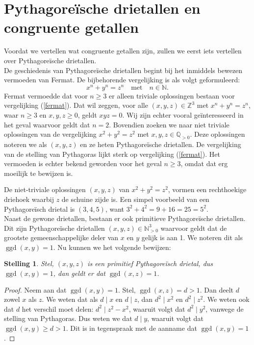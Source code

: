 \documentclass[12pt,reqno]{article}
\newcommand*{\NN}{\ensuremath{\mathbb{N}}}
\newcommand*{\ZZ}{\ensuremath{\mathbb{Z}}}
\newcommand*{\QQ}{\ensuremath{\mathbb{Q}}}
\theoremstyle{theorem}
\newtheorem{theorem}{Stelling}
\theoremstyle{definition}
\DeclareMathOperator{\ggd}{ggd}
\begin{document}
	
	\section{Pythagore\"ische drietallen en congruente getallen}\label{sec:def}
	Voordat we vertellen wat congruente getallen zijn, zullen we eerst iets vertellen over Pythagore\"ische drietallen.\\
	
	De geschiedenis van Pythagore\"ische drietallen begint bij het inmiddels bewezen vermoeden van Fermat. De bijbehorende vergelijking is als volgt geformuleerd:
	\begin{equation}\label{fermat}
	x^n + y^n = z^n \quad \text{met} \quad n \in \NN.
	\end{equation}
	Fermat vermoedde dat voor $n \geq 3$ er alleen triviale oplossingen bestaan voor vergelijking (\ref{fermat}). Dat wil zeggen, voor alle $(x,y,z) \in \ZZ^3$ met $x^n + y^n = z^n$, waar $n \geq 3$ en $x, y, z \geq 0$, geldt $xyz = 0$. Wij zijn echter vooral ge\"interesseerd in het geval waarvoor geldt dat $n=2$. Bovendien zoeken we naar niet triviale oplossingen van de vergelijking $x^2 + y^2 = z^2$ met $x,y,z \in\QQ_{>0}$. Deze oplossingen noteren we als $(x,y,z)$ en ze heten Pythagore\"ische drietallen. De vergelijking van de stelling van Pythagoras lijkt sterk op vergelijking (\ref{fermat}). Het vermoeden is echter bekend geworden voor het geval $n \geq 3$, omdat dat erg moeilijk te bewijzen is.
	
	De niet-triviale oplossingen $(x,y,z)$ van $x^2 + y^2 = z^2$, vormen een rechthoekige driehoek waarbij $z$ de schuine zijde is. Een simpel voorbeeld van een Pythagore\"isch drietal is $(3,4,5)$, want $3^2 + 4^2 = 9 + 16 = 25 = 5^2$. \\
	
	Naast de gewone drietallen, bestaan er ook primitieve \mbox{Pythagore\"ische} drietallen. Dit zijn Pythagore\"ische drietallen $(x,y,z)\in\NN^3_{>0}$ waarvoor geldt dat de grootste gemeenschappelijke deler van $x$ en $y$ gelijk is aan 1. We noteren dit als $\ggd(x,y) = 1$. Nu kunnen we het volgende bewijzen:
	
	\begin{theorem}
		Stel, $(x,y,z)$ is een primitief Pythagore\"isch drietal, dus $\ggd(x,y) = 1$, dan geldt er dat $\ggd(x,z) = 1$.
	\end{theorem}
	\begin{proof}
		Neem aan dat $\ggd(x,y) = 1$. Stel, $\ggd(x,z) = d > 1$. Dan deelt $d$ zowel $x$ als $z$. We weten dat als $d \mid x$ en $d \mid z$, dan $d^2\mid x^2$ en $d^2 \mid z^2$. We weten ook dat $d$ het verschil moet delen: $d^2\mid z^2 - x^2$, waaruit volgt dat $d^2 \mid y^2$, vanwege de stelling van Pythagoras. Dus weten we dat $d \mid y$, waaruit volgt dat $\ggd(x, y) \geq d > 1$. Dit is in tegenspraak met de aanname dat $\ggd(x,y) = 1$.
	\end{proof}
	
\end{document}
